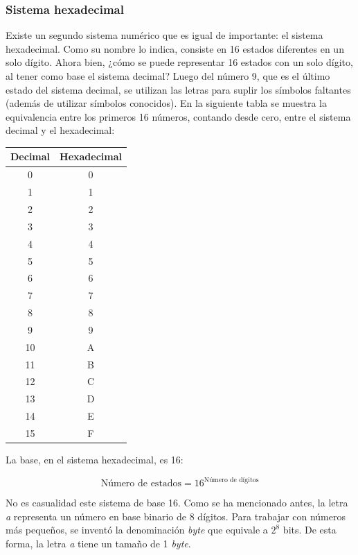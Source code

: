 \documentclass[12pt,a4paper,twoside]{book}
\begin{document}
\subsubsection{Sistema hexadecimal}
Existe un segundo sistema numérico que es igual de importante: el sistema hexadecimal. Como su nombre lo indica, consiste en 16 estados diferentes en un solo dígito. Ahora bien, ¿cómo se puede representar 16 estados con un solo dígito, al tener como base el sistema decimal? Luego del número 9, que es el último estado del sistema decimal, se utilizan las letras para suplir los símbolos faltantes (además de utilizar símbolos conocidos). En la siguiente tabla se muestra la equivalencia entre los primeros 16 números, contando desde cero, entre el sistema decimal y el hexadecimal:

\begin{center}
\begin{longtable}{|c|c|}
\hline 
\textbf{Decimal} & \textbf{Hexadecimal} \\ 
\hline 
0 & 0 \\ 
\hline 
1 & 1 \\ 
\hline 
2 & 2 \\ 
\hline 
3 & 3 \\ 
\hline 
4 & 4 \\ 
\hline 
5 & 5 \\ 
\hline 
6 & 6 \\ 
\hline 
7 & 7 \\ 
\hline 
8 & 8 \\ 
\hline 
9 & 9 \\ 
\hline 
10 & A \\ 
\hline 
11 & B \\ 
\hline 
12 & C \\ 
\hline 
13 & D \\
\hline 
14 & E \\ 
\hline 
15 & F \\ 
\hline 
\end{longtable} 
\end{center}

La base, en el sistema hexadecimal, es 16:

\[
\text{Número de estados} = 16^{\text{Número de dígitos}}
\]

No es casualidad este sistema de base 16. Como se ha mencionado antes, la letra \textit{a} representa un número en base binario de 8 dígitos. Para trabajar con números más pequeños, se inventó la denominación \textit{byte} que equivale a $ 2^{8} $ bits. De esta forma, la letra \textit{a} tiene un tamaño de 1 \textit{byte}.
\end{document}
